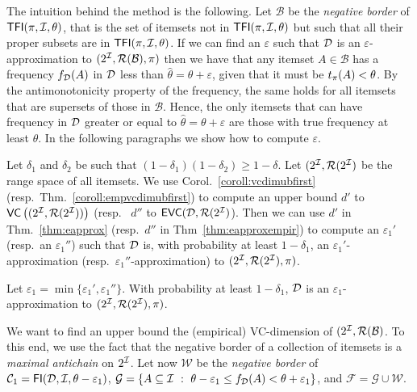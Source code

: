 The intuition behind the method is the following. 
Let $\mathcal{B}$ be
the \emph{negative border} of $\mathsf{TFI}(\pi,{\cal I},\theta)$, that is the set of itemsets
not in $\mathsf{TFI}(\pi,{\cal I},\theta)$ but such that all their proper subsets are in
$\mathsf{TFI}(\pi,{\cal I},\theta)$. If we can find an $\varepsilon$ such that ${\cal D}$ is an
$\varepsilon$-approximation to $(2^{\cal I},\mathcal{R}(\mathcal{B}),\pi)$ then %
we have that any itemset
$A\in\mathcal{B}$ has a frequency $f_{\cal D}(A)$ in ${\cal D}$ less than
$\hat{\theta}=\theta+\varepsilon$, given that it must be $t_\pi(A)<\theta$. By the
antimonotonicity property of the frequency, the same holds for all itemsets that
are supersets of those in $\mathcal{B}$. Hence, the only itemsets that can have
frequency in ${\cal D}$ greater or equal to $\hat{\theta}=\theta+\varepsilon$ are
those with true frequency at least $\theta$. In the following paragraphs we show
how to compute $\varepsilon$.

Let $\delta_1$ and $\delta_2$ be such that $(1-\delta_1)(1-\delta_2)\ge
1-\delta$. Let $(2^{\cal I},\mathcal{R}(2^{\cal I})$ be the range space of all itemsets.
We use Corol.~\ref{coroll:vcdimubfirst} (resp.~Thm.~\ref{coroll:empvcdimubfirst}) to
compute an upper bound $d'$ to $\mathsf{VC}\left((2^{\cal I},\mathcal{R}(2^{\cal I}))\right)$ (resp.~ $d''$ to
$\mathsf{EVC}({\cal D},\mathcal{R}(2^{\cal I})$). Then we can use $d'$ in Thm.~\ref{thm:eapprox} (resp.~$d''$ in
Thm~\ref{thm:eapproxempir}) to compute an $\varepsilon_1'$ (resp.~an
$\varepsilon_1''$) such that ${\cal D}$ is, with probability at
least $1-\delta_1$, an $\varepsilon_1'$-approximation
(resp.~$\varepsilon_1''$-approximation) to $(2^{\cal I},\mathcal{R}(2^{\cal I}),\pi)$.
\begin{fact}
Let
$\varepsilon_1=\min\{\varepsilon_1',\varepsilon_1''\}$. %
With probability at least $1-\delta_1$, ${\cal D}$ is an
$\varepsilon_1$-approximation to $(2^{\cal I},\mathcal{R}(2^{\cal I}),\pi)$.
\end{fact}

We want to find an upper bound the (empirical) VC-dimension of
$(2^{\cal I},\mathcal{R}(\mathcal{B})$. To this end, we use the fact that the negative border of a
collection of itemsets is a \emph{maximal
antichain} on $2^{\cal I}$. %
Let now $\mathcal{W}$ be the \emph{negative
border} of $\mathcal{C}_1=\mathsf{FI}({\cal D},{\cal I},\theta-\varepsilon_1)$, 
$\mathcal{G}=\{A\subseteq{\cal I} ~:~ \theta-\varepsilon_1\le
f_{\cal D}(A)<\theta+\varepsilon_1\}$, and $\mathcal{F}=\mathcal{G}\cup\mathcal{W}$.

